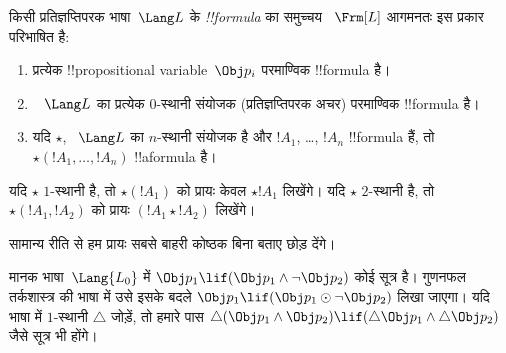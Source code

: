 \documentclass[../../../include/open-logic-section]{subfiles}
\begin{document}


\begin{defn}[सूत्र]
किसी प्रतिज्ञप्तिपरक भाषा~$\Lang L$ के \emph{!!{formula}} का समुच्चय
~$\Frm[L]$ आगमनतः इस प्रकार परिभाषित है:
\begin{enumerate}
\item प्रत्येक !!{propositional variable}~$\Obj p_i$ परमाण्विक
  !!{formula} है।
\item ~ $\Lang L$ का प्रत्येक $0$-स्थानी संयोजक (प्रतिज्ञप्तिपरक अचर)
परमाण्विक !!{formula} है।
\item यदि $\star$, ~$\Lang L$ का $n$-स्थानी संयोजक है और $!A_1$, \dots,
$!A_n$ !!{formula} हैं, तो $\star(!A_1, \dots, !A_n)$ !!a{formula} है।
\end{enumerate}
यदि $\star$ $1$-स्थानी है, तो $\star(!A_1)$ को प्रायः केवल $\star !A_1$
लिखेंगे। यदि $\star$ $2$-स्थानी है, तो $\star(!A_1,!A_2)$ को प्रायः
$(!A_1 \star !A_2)$ लिखेंगे।
\end{defn}

सामान्य रीति से हम प्रायः सबसे बाहरी कोष्ठक बिना बताए छोड़ देंगे।

\begin{ex}
  मानक भाषा~$\Lang{L_0}$ में $\Obj p_1 \lif (\Obj p_1 \land \lnot \Obj
  p_2)$ कोई सूत्र है। गुणनफल तर्कशास्त्र की भाषा में उसे इसके बदले $\Obj
  p_1 \lif (\Obj p_1 \odot \lnot \Obj p_2)$ लिखा जाएगा। यदि भाषा में
  $1$-स्थानी $\triangle$ जोड़ें, तो हमारे पास $\triangle (\Obj p_1 \land
  \Obj p_2) \lif (\triangle \Obj p_1 \land \triangle \Obj p_2)$ जैसे
  सूत्र भी होंगे।
\end{ex}
\end{document}
